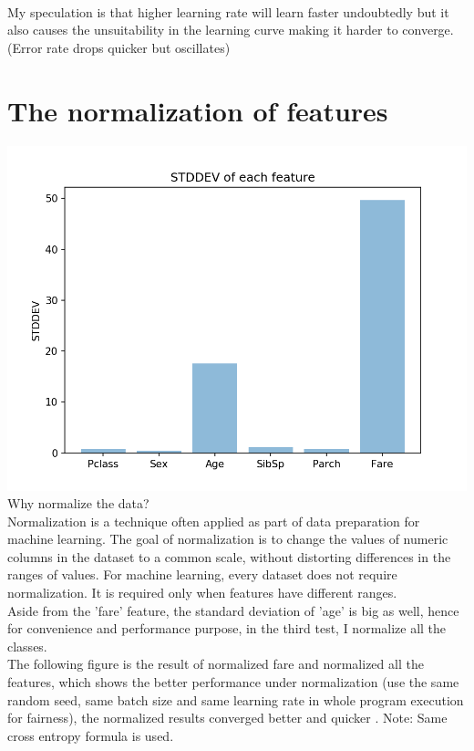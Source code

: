 \documentclass[11pt, a4paper]{article} %
\begin{document}
\\ My speculation is that higher learning rate will learn faster undoubtedly but it also causes the unsuitability in the learning curve making it harder to converge. (Error rate drops quicker but oscillates) 

\section{The normalization of features}
\includegraphics[scale = 0.7]{figure_2/STDDEV.png}
\\ Why normalize the data? 
\\ Normalization is a technique often applied as part of data preparation for machine learning. The goal of normalization is to change the values of numeric columns in the dataset to a common scale, without distorting differences in the ranges of values. For machine learning, every dataset does not require normalization. It is required only when features have different ranges.
\\ Aside from the 'fare' feature, the standard deviation of 'age' is big as well, hence for convenience and performance purpose, in the third test, I normalize all the classes.
\\ The following figure is the result of normalized fare and normalized all the features, which shows the better performance under normalization (use the same random seed, same batch size and same learning rate in whole program execution for fairness), the normalized results converged better and quicker . Note: Same cross entropy formula is used.
\end{document}
